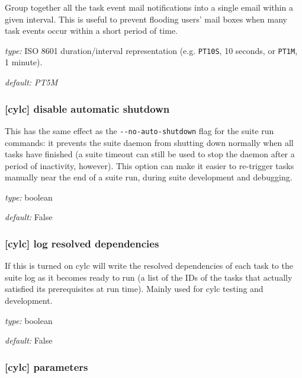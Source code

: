 Group together all the task event mail notifications into a single email within
a given interval. This is useful to prevent flooding users' mail boxes when
many task events occur within a short period of time.

\begin{myitemize}
  \item {\em type:} ISO 8601 duration/interval representation (e.g. \lstinline=PT10S=, 10 seconds, or \lstinline=PT1M=, 1 minute).
  \item {\em default: PT5M}
\end{myitemize}

\subsubsection[disable automatic shutdown]{[cylc] \textrightarrow disable automatic shutdown}

This has the same effect as the \lstinline{--no-auto-shutdown} flag for
the suite run commands: it prevents the suite daemon from shutting down
normally when all tasks have finished (a suite timeout can still be used to
stop the daemon after a period of inactivity, however).  This option can
make it easier to re-trigger tasks manually near the end of a suite run,
during suite development and debugging.

\begin{myitemize}
    \item {\em type:} boolean
    \item {\em default:} False
\end{myitemize}

\subsubsection[log resolved dependencies]{[cylc] \textrightarrow log resolved dependencies}

If this is turned on cylc will write the resolved dependencies of each
task to the suite log as it becomes ready to run (a list of the IDs of
the tasks that actually satisfied its prerequisites at run time). Mainly
used for cylc testing and development.

\begin{myitemize}
    \item {\em type:} boolean
    \item {\em default:} False
\end{myitemize}

\subsubsection[parameters]{[cylc] \textrightarrow parameters}

